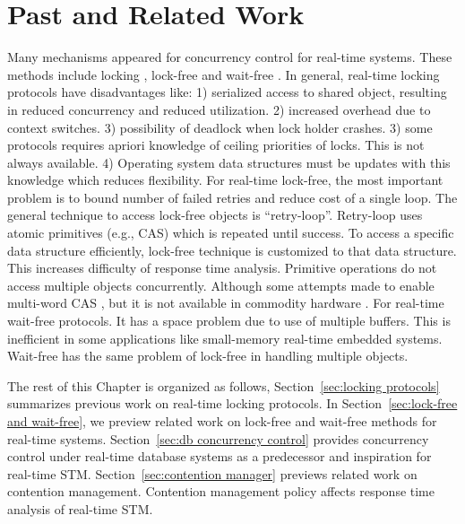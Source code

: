 \chapter{\label{related_work}Past and Related Work}

Many mechanisms appeared for concurrency control for real-time systems.
These methods include locking \cite{Levine:2012:PIF:2148436.2148438,Buttazzo:2004:HRC:1027504},
lock-free \cite{anderson96framework,563704,anderson1997lock,holman2006supporting,Lai:2009:SSR:1529282.1529660,1656921,726426,4297311,5669659,key-5}
and wait-free \cite{726426,1508449,Cho:2006:UAP:1141277.1141490,4297311,1003807,hohmuth2001pragmatic,1613351,811240,896371,896423,1203552,5953690}.
In general, real-time locking protocols have disadvantages like: 1) serialized access to shared object, resulting in reduced concurrency and reduced utilization. 2) increased overhead due to context switches. 3) possibility of deadlock when lock holder crashes.  3) some protocols requires apriori knowledge of ceiling priorities of locks. This is not always available. 4) Operating system data structures must be updates with this knowledge which reduces flexibility. For real-time lock-free, the most important problem is to bound number of failed retries and reduce cost of a single loop. The general technique to access lock-free objects is {}``retry-loop''. Retry-loop uses atomic primitives (e.g., CAS) which is repeated until success. To access a specific data structure efficiently, lock-free technique is customized to that data structure. This increases difficulty of response time analysis. Primitive operations do not access multiple objects concurrently. Although some attempts made to enable multi-word CAS \cite{563704}, but it is not available in commodity hardware \cite{Meawad:2011:RWQ:2043910.2043912}. For real-time wait-free protocols. It has a space problem due to use of multiple buffers. This is inefficient in some applications like small-memory real-time embedded systems. Wait-free has the same problem of lock-free in handling multiple objects.

The rest of this Chapter is organized as follows, Section~\ref{sec:locking protocols} summarizes previous work on real-time locking protocols. In Section~\ref{sec:lock-free and wait-free}, we preview related work on lock-free and wait-free methods for real-time systems. Section~\ref{sec:db concurrency control} provides concurrency control under real-time database systems as a predecessor and inspiration for real-time STM. Section~\ref{sec:contention manager} previews related work on contention management. Contention management policy affects response time analysis of real-time STM.

